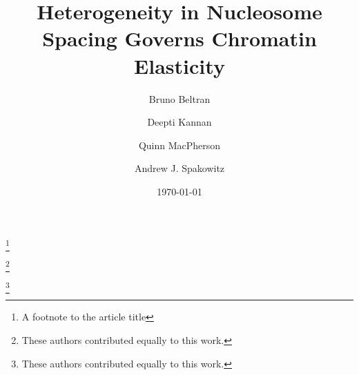 \documentclass[%
 reprint,
superscriptaddress,
showpacs,preprintnumbers,
 amsmath,amssymb,
 aps,
 prl,
]{revtex4-1}
\begin{document}

\title{Heterogeneity in Nucleosome Spacing Governs Chromatin Elasticity}%
\thanks{A footnote to the article title}%

\author{Bruno Beltran}
\thanks{These authors contributed equally to this work.}%
%
\author{Deepti Kannan}%
\thanks{These authors contributed equally to this work.}%
\author{Quinn MacPherson}%
%
\author{Andrew J. Spakowitz}%
%
%
\date{\today}%
\end{document}

